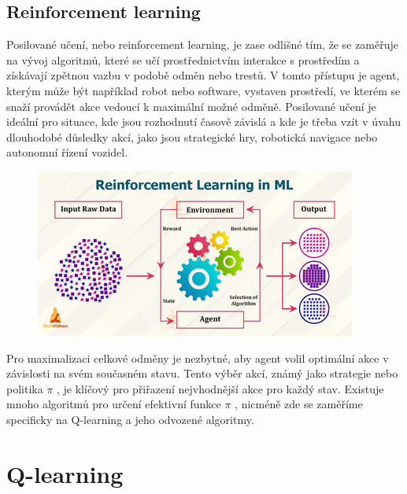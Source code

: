 \documentclass[12pt, a4paper,
twoside,        %
openright
]{report}
\begin{document}
\subsection{Reinforcement learning}
Posilované učení, nebo reinforcement learning, je zase odlišné tím, že se zaměřuje na vývoj algoritmů, které se učí prostřednictvím interakce s prostředím a získávají zpětnou vazbu v podobě odměn nebo trestů. V tomto přístupu je agent, kterým může být například robot nebo software, vystaven prostředí, ve kterém se snaží provádět akce vedoucí k maximální možné odměně. Posilované učení je ideální pro situace, kde jsou rozhodnutí časově závislá a kde je třeba vzít v úvahu dlouhodobé důsledky akcí, jako jsou strategické hry, robotická navigace nebo autonomní řízení vozidel.
\begin{figure}[h]
	\centering
	\includegraphics[width=0.8\linewidth, height=0.8\linewidth, keepaspectratio]{image/reinu.png}
	
\end{figure}

Pro maximalizaci celkové odměny je nezbytné, aby agent volil optimální akce v závislosti na svém současném stavu. Tento výběr akcí, známý jako strategie nebo politika $\pi$
, je klíčový pro přiřazení nejvhodnější akce pro každý stav. Existuje mnoho algoritmů pro určení efektivní funkce $\pi$
, nicméně zde se zaměříme specificky na Q-learning a jeho odvozené algoritmy.




\section{Q-learning}
\end{document}
